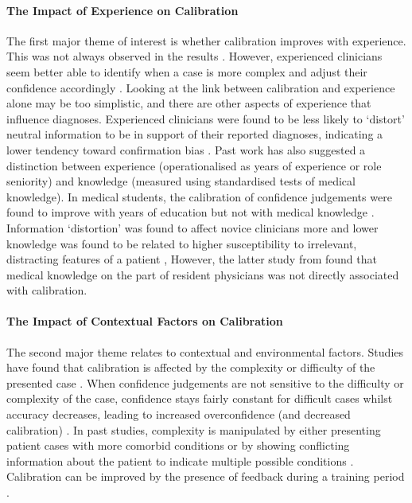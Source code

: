 \documentclass[a4paper, nobind]{templates/ociamthesis}
\begin{document}
\paragraph{The Impact of Experience on Calibration}\label{the-impact-of-experience-on-calibration}

The first major theme of interest is whether calibration improves with experience. This was not always observed in the results \autocite{yang_nurses_2010,clayton_are_2023}. However, experienced clinicians seem better able to identify when a case is more complex and adjust their confidence accordingly \autocite{tabak_clinical_1996,brannon_nursing_2003}. Looking at the link between calibration and experience alone may be too simplistic, and there are other aspects of experience that influence diagnoses. Experienced clinicians were found to be less likely to `distort' neutral information to be in support of their reported diagnoses, indicating a lower tendency toward confirmation bias \autocite{kostopoulou_information_2012}. Past work has also suggested a distinction between experience (operationalised as years of experience or role seniority) and knowledge (measured using standardised tests of medical knowledge). In medical students, the calibration of confidence judgements were found to improve with years of education but not with medical knowledge \autocite{hautz_diagnostic_2019}. Information `distortion' was found to affect novice clinicians more \autocite{kostopoulou_information_2012} and lower knowledge was found to be related to higher susceptibility to irrelevant, distracting features of a patient \autocite{mamede_role_2024}, However, the latter study from \textcite{mamede_role_2024} found that medical knowledge on the part of resident physicians was not directly associated with calibration.

\paragraph{The Impact of Contextual Factors on Calibration}\label{the-impact-of-contextual-factors-on-calibration}

The second major theme relates to contextual and environmental factors. Studies have found that calibration is affected by the complexity or difficulty of the presented case \autocite{meyer_physicians_2013,hausmann_sensitivity_2019,li_relationship_2023}. When confidence judgements are not sensitive to the difficulty or complexity of the case, confidence stays fairly constant for difficult cases whilst accuracy decreases, leading to increased overconfidence (and decreased calibration) \autocite{meyer_physicians_2013}. In past studies, complexity is manipulated by either presenting patient cases with more comorbid conditions \autocite{hausmann_sensitivity_2019} or by showing conflicting information about the patient to indicate multiple possible conditions \autocite{yang_nurses_2010}. Calibration can be improved by the presence of feedback during a training period \autocite{kuhn_improving_2022,staal_impact_2024}.
\end{document}
